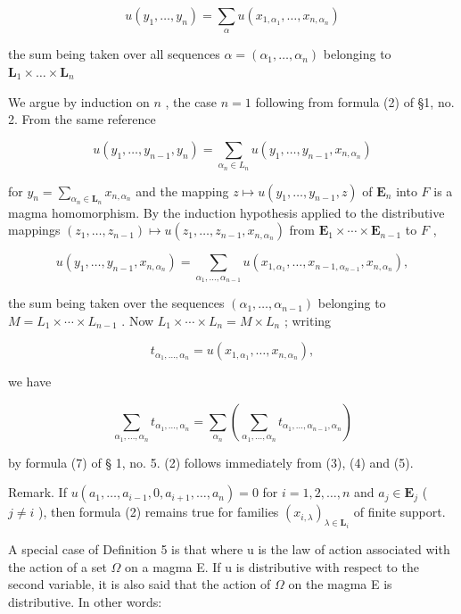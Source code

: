 \[
u (y _ {1}, \dots , y _ {n}) = \sum_ {\alpha} u (x _ {1, \alpha_ {1}}, \dots , x _ {n, \alpha_ {n}})\tag{2}
\]

the sum being taken over all sequences \(\alpha = (\alpha_{1},\ldots ,\alpha_{n})\) belonging to \(\mathbf{L}_1\times \dots \times \mathbf{L}_n\)

We argue by induction on \(n\) , the case \(n = 1\) following from formula (2) of §1, no. 2. From the same reference

\[
u (y _ {1}, \dots , y _ {n - 1}, y _ {n}) = \sum_ {\alpha_ {n} \in L _ {n}} u (y _ {1}, \dots , y _ {n - 1}, x _ {n, \alpha_ {n}})\tag{3}
\]

for \(y_{n} = \sum_{\alpha_{n} \in \mathbf{L}_{n}} x_{n, \alpha_{n}}\) and the mapping \(z \mapsto u(y_{1}, \ldots, y_{n-1}, z)\) of \(\mathbf{E}_{n}\) into \(F\) is a magma homomorphism. By the induction hypothesis applied to the distributive mappings \((z_{1}, \ldots, z_{n-1}) \mapsto u(z_{1}, \ldots, z_{n-1}, x_{n, \alpha_{n}})\) from \(\mathbf{E}_{1} \times \cdots \times \mathbf{E}_{n-1}\) to \(F\) ,

\[
u (y _ {1}, \dots , y _ {n - 1}, x _ {n, \alpha_ {n}}) = \sum_ {\alpha_ {1}, \dots , \alpha_ {n - 1}} u (x _ {1, \alpha_ {1}}, \dots , x _ {n - 1, \alpha_ {n - 1}}, x _ {n, \alpha_ {n}}),\tag{4}
\]

the sum being taken over the sequences \((\alpha_{1},\ldots,\alpha_{n-1})\) belonging to \(M=L_{1}\times\cdots\times L_{n-1}\) . Now \(L_{1}\times\cdots\times L_{n}=M\times L_{n}\) ; writing

\[
t _ {\alpha_ {1}, \dots , \alpha_ {n}} = u (x _ {1, \alpha_ {1}}, \dots , x _ {n, \alpha_ {n}}),
\]

we have

\[
\sum_ {\alpha_ {1}, \dots , \alpha_ {n}} t _ {\alpha_ {1}, \dots , \alpha_ {n}} = \sum_ {\alpha_ {n}} \left(\sum_ {\alpha_ {1}, \dots , \alpha_ {n}} t _ {\alpha_ {1}, \dots , \alpha_ {n - 1}, \alpha_ {n}}\right)\tag{5}
\]

by formula (7) of § 1, no. 5. (2) follows immediately from (3), (4) and (5).

Remark. If \(u(a_{1},\ldots ,a_{i - 1},0,a_{i + 1},\ldots ,a_{n}) = 0\) for \(i = 1,2,\dots,n\) and \(a_{j}\in \mathbf{E}_{j}\) ( \(j\neq i\) ), then formula (2) remains true for families \((x_{i,\lambda})_{\lambda \in \mathbf{L}_i}\) of finite support.

A special case of Definition 5 is that where u is the law of action associated with the action of a set \(\Omega\) on a magma E. If u is distributive with respect to the second variable, it is also said that the action of \(\Omega\) on the magma E is distributive. In other words:

